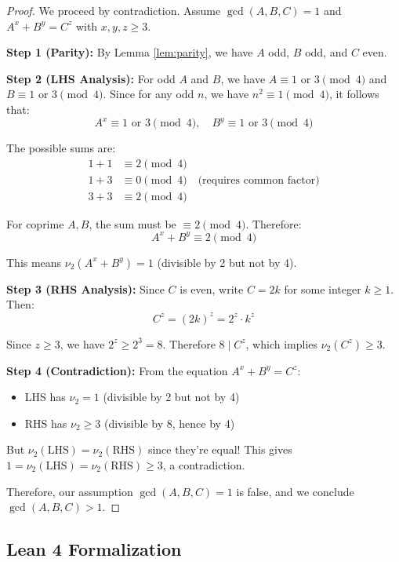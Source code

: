 \documentclass[12pt,a4paper]{article}
\theoremstyle{definition}
\theoremstyle{remark}
\begin{document}
\begin{proof}
We proceed by contradiction. Assume $\gcd(A, B, C) = 1$ and $A^x + B^y = C^z$ with $x,y,z \geq 3$.

\textbf{Step 1 (Parity):} By Lemma \ref{lem:parity}, we have $A$ odd, $B$ odd, and $C$ even.

\textbf{Step 2 (LHS Analysis):} For odd $A$ and $B$, we have $A \equiv 1$ or $3 \pmod{4}$ and $B \equiv 1$ or $3 \pmod{4}$. Since for any odd $n$, we have $n^2 \equiv 1 \pmod{4}$, it follows that:
\[
A^x \equiv 1 \text{ or } 3 \pmod{4}, \quad B^y \equiv 1 \text{ or } 3 \pmod{4}
\]

The possible sums are:
\begin{align*}
1 + 1 &\equiv 2 \pmod{4} \\
1 + 3 &\equiv 0 \pmod{4} \quad \text{(requires common factor)} \\
3 + 3 &\equiv 2 \pmod{4}
\end{align*}

For coprime $A, B$, the sum must be $\equiv 2 \pmod{4}$. Therefore:
\[
A^x + B^y \equiv 2 \pmod{4}
\]

This means $\nu_2(A^x + B^y) = 1$ (divisible by 2 but not by 4).

\textbf{Step 3 (RHS Analysis):} Since $C$ is even, write $C = 2k$ for some integer $k \geq 1$. Then:
\[
C^z = (2k)^z = 2^z \cdot k^z
\]

Since $z \geq 3$, we have $2^z \geq 2^3 = 8$. Therefore $8 \mid C^z$, which implies $\nu_2(C^z) \geq 3$.

\textbf{Step 4 (Contradiction):} From the equation $A^x + B^y = C^z$:
\begin{itemize}
\item LHS has $\nu_2 = 1$ (divisible by 2 but not by 4)
\item RHS has $\nu_2 \geq 3$ (divisible by 8, hence by 4)
\end{itemize}

But $\nu_2(\text{LHS}) = \nu_2(\text{RHS})$ since they're equal! This gives $1 = \nu_2(\text{LHS}) = \nu_2(\text{RHS}) \geq 3$, a contradiction.

Therefore, our assumption $\gcd(A,B,C) = 1$ is false, and we conclude $\gcd(A,B,C) > 1$.
\end{proof}

\subsection{Lean 4 Formalization}
\end{document}

